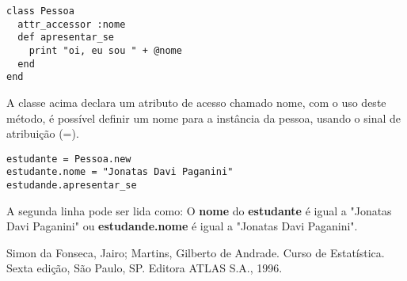 \documentclass[espaco=simples,appendix=Name]{abnt}
\newcommand{\code}[1] {\textbf{#1}}
\begin{document}
\begin{lstlisting}[caption=Criando uma classe com atributos]
class Pessoa
  attr_accessor :nome
  def apresentar_se 
    print "oi, eu sou " + @nome
  end
end
\end{lstlisting}

A classe acima declara um atributo de acesso chamado nome, com o uso deste método, é possível definir um nome para a instância da pessoa, usando o sinal de atribuição (=).

\begin{lstlisting}[caption=Usando uma classe com métodos e atributos de acesso]
estudante = Pessoa.new
estudante.nome = "Jonatas Davi Paganini"
estudande.apresentar_se
\end{lstlisting}

A segunda linha pode ser lida como: O \code{nome} do \code{estudante} é igual a "Jonatas Davi Paganini" ou \code{estudande.nome} é igual a "Jonatas Davi Paganini".



\begin{thebibliography}{9}

Simon da Fonseca, Jairo; Martins, Gilberto de Andrade.
Curso de Estatística.
Sexta edição, São Paulo, SP. Editora ATLAS S.A., 1996.
\end{thebibliography} 
\end{document}

